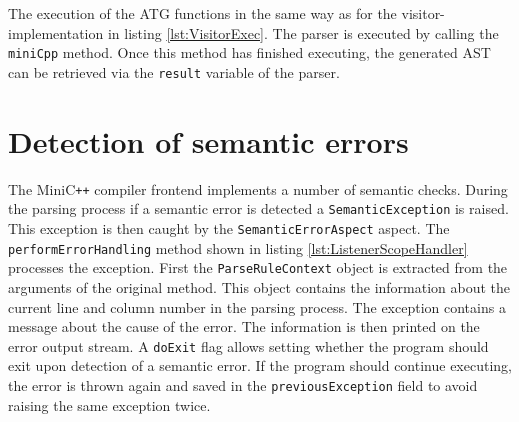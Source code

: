 

The execution of the ATG functions in the same way as for the visitor-implementation in listing \ref{lst:VisitorExec}. The parser is executed by calling the \verb|miniCpp| method. Once this method has finished executing, the generated AST can be retrieved via the \verb|result| variable of the parser. 


\section{Detection of semantic errors}

The MiniC\verb|++| compiler frontend implements a number of semantic checks. During the parsing process if a semantic error is detected a \verb|SemanticException| is raised. This exception is then caught by the \verb|SemanticErrorAspect| aspect. The \verb|performErrorHandling| method shown in listing \ref{lst:ListenerScopeHandler} processes the exception. First the \verb|ParseRuleContext| object is extracted from the arguments of the original method. This object contains the information about the current line and column number in the parsing process. The exception contains a message about the cause of the error. The information is then printed on the error output stream. A \verb|doExit| flag allows setting whether the program should exit upon detection of a semantic error. If the program should continue executing, the error is thrown again and saved in the \verb|previousException| field to avoid raising the same exception twice.    


